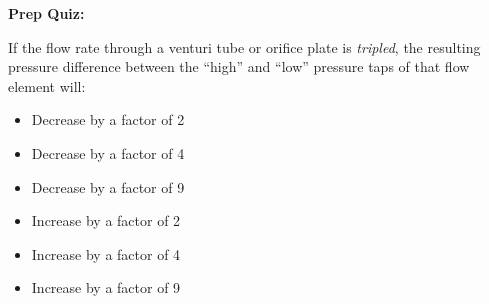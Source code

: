 \vfil \eject

\noindent
{\bf Prep Quiz:}

If the flow rate through a venturi tube or orifice plate is {\it tripled}, the resulting pressure difference between the ``high'' and ``low'' pressure taps of that flow element will:

\begin{itemize}
\item{} Decrease by a factor of 2
\vskip 5pt 
\item{} Decrease by a factor of 4
\vskip 5pt 
\item{} Decrease by a factor of 9
\vskip 5pt 
\item{} Increase by a factor of 2
\vskip 5pt 
\item{} Increase by a factor of 4
\vskip 5pt 
\item{} Increase by a factor of 9
\end{itemize}






